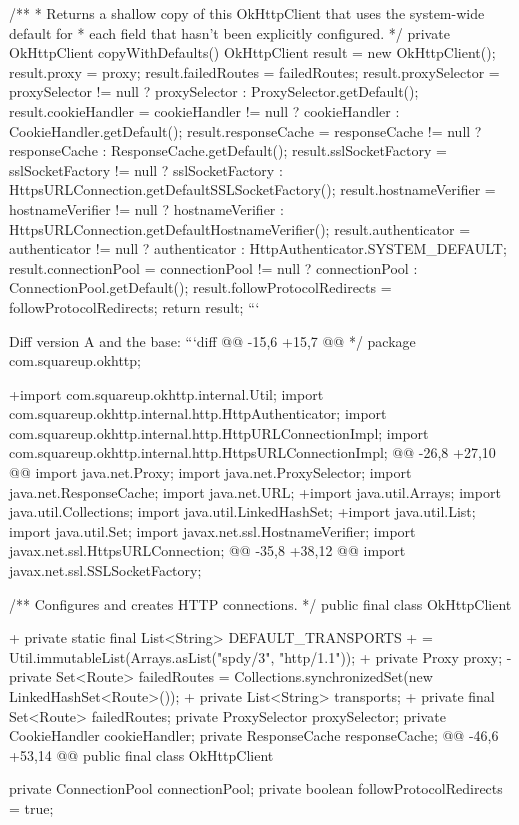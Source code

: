 \begin{prompt}
{  /**
   * Returns a shallow copy of this OkHttpClient that uses the system-wide default for
   * each field that hasn't been explicitly configured.
   */
  private OkHttpClient copyWithDefaults() {
    OkHttpClient result = new OkHttpClient();
    result.proxy = proxy;
    result.failedRoutes = failedRoutes;
    result.proxySelector = proxySelector != null ? proxySelector : ProxySelector.getDefault();
    result.cookieHandler = cookieHandler != null ? cookieHandler : CookieHandler.getDefault();
    result.responseCache = responseCache != null ? responseCache : ResponseCache.getDefault();
    result.sslSocketFactory = sslSocketFactory != null
        ? sslSocketFactory
        : HttpsURLConnection.getDefaultSSLSocketFactory();
    result.hostnameVerifier = hostnameVerifier != null
        ? hostnameVerifier
        : HttpsURLConnection.getDefaultHostnameVerifier();
    result.authenticator = authenticator != null
        ? authenticator
        : HttpAuthenticator.SYSTEM_DEFAULT;
    result.connectionPool = connectionPool != null ? connectionPool : ConnectionPool.getDefault();
    result.followProtocolRedirects = followProtocolRedirects;
    return result;
  }
}
```

Diff version A and the base:
```diff
@@ -15,6 +15,7 @@
  */
 package com.squareup.okhttp;

+import com.squareup.okhttp.internal.Util;
 import com.squareup.okhttp.internal.http.HttpAuthenticator;
 import com.squareup.okhttp.internal.http.HttpURLConnectionImpl;
 import com.squareup.okhttp.internal.http.HttpsURLConnectionImpl;
@@ -26,8 +27,10 @@ import java.net.Proxy;
 import java.net.ProxySelector;
 import java.net.ResponseCache;
 import java.net.URL;
+import java.util.Arrays;
 import java.util.Collections;
 import java.util.LinkedHashSet;
+import java.util.List;
 import java.util.Set;
 import javax.net.ssl.HostnameVerifier;
 import javax.net.ssl.HttpsURLConnection;
@@ -35,8 +38,12 @@ import javax.net.ssl.SSLSocketFactory;

 /** Configures and creates HTTP connections. */
 public final class OkHttpClient {
+  private static final List<String> DEFAULT_TRANSPORTS
+      = Util.immutableList(Arrays.asList("spdy/3", "http/1.1"));
+
   private Proxy proxy;
-  private Set<Route> failedRoutes = Collections.synchronizedSet(new LinkedHashSet<Route>());
+  private List<String> transports;
+  private final Set<Route> failedRoutes;
   private ProxySelector proxySelector;
   private CookieHandler cookieHandler;
   private ResponseCache responseCache;
@@ -46,6 +53,14 @@ public final class OkHttpClient {
   private ConnectionPool connectionPool;
   private boolean followProtocolRedirects = true;

}}
\end{prompt}
